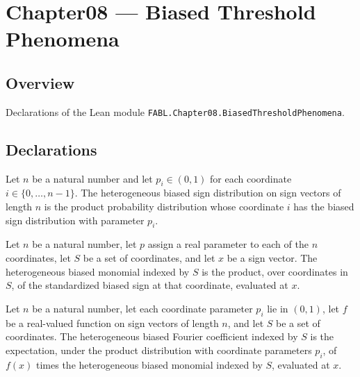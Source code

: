 \chapter{Chapter08 — Biased Threshold Phenomena}
\section{Overview}

Declarations of the Lean module \texttt{FABL.Chapter08.BiasedThresholdPhenomena}.

\section{Declarations}

\begin{definition}
\label{FABL.heterogeneousBiasedSignPMF}
\leanok
{}
Let $n$ be a natural number and let $p_i\in(0,1)$ for each coordinate
$i\in\{0,\ldots,n-1\}$. The heterogeneous biased sign distribution on sign vectors of
length $n$ is the product probability distribution whose coordinate $i$ has the biased
sign distribution with parameter $p_i$.
\end{definition}

\begin{definition}
\label{FABL.heterogeneousBiasedMonomial}
\leanok
{}
Let $n$ be a natural number, let $p$ assign a real parameter to each of the $n$
coordinates, let $S$ be a set of coordinates, and let $x$ be a sign vector. The
heterogeneous biased monomial indexed by $S$ is the product, over coordinates in $S$, of
the standardized biased sign at that coordinate, evaluated at $x$.
\end{definition}

\begin{definition}
\label{FABL.heterogeneousBiasedFourierCoeff}
\leanok
{}
Let $n$ be a natural number, let each coordinate parameter $p_i$ lie in $(0,1)$, let $f$
be a real-valued function on sign vectors of length $n$, and let $S$ be a set of
coordinates. The heterogeneous biased Fourier coefficient indexed by $S$ is the
expectation, under the product distribution with coordinate parameters $p_i$, of $f(x)$
times the heterogeneous biased monomial indexed by $S$, evaluated at $x$.
\end{definition}

